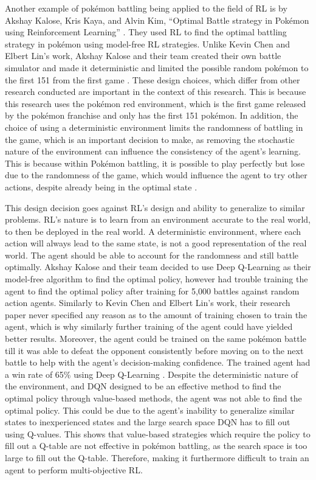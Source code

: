 Another example of pokémon battling being applied to the field of RL is by Akshay Kalose, Kris Kaya, and Alvin Kim, ``Optimal Battle strategy in Pokémon using Reinforcement Learning'' \cite{kalose2018optimal}. They used RL to find the optimal battling strategy in pokémon using model-free RL strategies. Unlike Kevin Chen and Elbert Lin's work, Akshay Kalose and their team created their own battle simulator and made it deterministic and limited the possible random pokémon to the first 151 from the first game \cite{kalose2018optimal}. These design choices, which differ from other research conducted are important in the context of this research. This is because this research uses the pokémon red environment, which is the first game released by the pokémon franchise and only has the first 151 pokémon. In addition, the choice of using a deterministic environment limits the randomness of battling in the game, which is an important decision to make, as removing the stochastic nature of the environment can influence the consistency of the agent's learning. This is because within Pokémon battling, it is possible to play perfectly but lose due to the randomness of the game, which would influence the agent to try other actions, despite already being in the optimal state \cite{kalose2018optimal}. 

This design decision goes against RL's design and ability to generalize to similar problems. RL's nature is to learn from an environment accurate to the real world, to then be deployed in the real world. A deterministic environment, where each action will always lead to the same state, is not a good representation of the real world. The agent should be able to account for the randomness and still battle optimally. Akshay Kalose and their team decided to use Deep Q-Learning as their model-free algorithm to find the optimal policy, however had trouble training the agent to find the optimal policy after training for 5,000 battles against random action agents. Similarly to Kevin Chen and Elbert Lin's work, their research paper never specified any reason as to the amount of training chosen to train the agent, which is why similarly further training of the agent could have yielded better results. Moreover, the agent could be trained on the same pokémon battle till it was able to defeat the opponent consistently before moving on to the next battle to help with the agent's decision-making confidence. The trained agent had a win rate of 65\% using Deep Q-Learning \cite{kalose2018optimal}. Despite the deterministic nature of the environment, and DQN designed to be an effective method to find the optimal policy through value-based methods, the agent was not able to find the optimal policy. This could be due to the agent's inability to generalize similar states to inexperienced states and the large search space DQN has to fill out using Q-values. This shows that value-based strategies which require the policy to fill out a Q-table are not effective in pokémon battling, as the search space is too large to fill out the Q-table. Therefore, making it furthermore difficult to train an agent to perform multi-objective RL.

